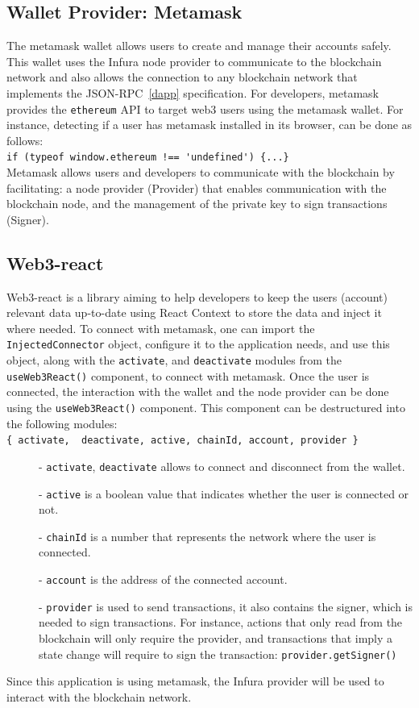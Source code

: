 \documentclass[11pt,a4paper]{report}
\begin{document}
\subsection{Wallet Provider: Metamask}\label{metamask}
The metamask\cite{wiki:MetaMask}\cite{metamaskDocs} wallet allows users to create and manage their accounts safely. This wallet uses the Infura node provider to communicate to the blockchain network and also allows the connection to any blockchain network that implements the JSON-RPC~\ref{dapp} specification. For developers, metamask provides the \verb|ethereum| API to target web3 users using the metamask wallet. For instance, detecting if a user has metamask installed in its browser, can be done as follows:\\
\verb|if (typeof window.ethereum !== 'undefined') {...}|\\
Metamask allows users and developers to communicate with the blockchain by facilitating:
a node provider (Provider) that enables communication with the blockchain node, and the management of the private key to sign transactions (Signer).

\subsection{Web3-react}\label{web3-react}
Web3-react\cite{web3react} is a library aiming to help developers to keep the users (account) relevant data up-to-date using React Context\cite{reactcontext} to store the data and inject it where needed. To connect with metamask, one can import the
\verb|InjectedConnector| object, configure it to the application needs, and use this object, along with the \verb|activate|, and \verb|deactivate| modules from the \verb|useWeb3React()| component, to connect with metamask. Once the user is connected, the interaction with the wallet and the node provider can be done using the \verb|useWeb3React()| component. This component can be destructured into the following modules:\\
\verb|{ activate,  deactivate, active, chainId, account, provider }|
\begin{description}
	\item[]- \verb|activate|, \verb|deactivate| allows to connect and disconnect from the wallet.
	\item[]- \verb|active| is a boolean value that indicates whether the user is connected or not.
	\item[]- \verb|chainId| is a number that represents the network where the user is connected.
	\item[]- \verb|account| is the address of the connected account.
	\item[]- \verb|provider| is used to send transactions, it also contains the signer, which is needed to sign transactions. For instance, actions that only read from the blockchain will only require the provider, and transactions that imply a state change will require to sign the transaction: \verb|provider.getSigner()|
\end{description}
Since this application is using metamask, the Infura provider will be used to interact with the blockchain network.
\end{document}
